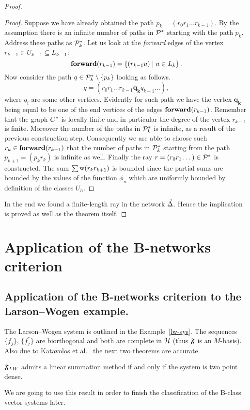 \documentclass[12pt]{amsart}
\begin{document}
\begin{proof}
\begin{proof}
        Suppose we have already obtained the path $p_k= (r_0 r_1\dots r_{k-1})$.
        By the assumption there is an infinite number of paths in $\cal{P}^*$ starting with the path $p_k$.
        Address these paths as $\cal{P}^*_k$.
        Let us look at the \emph{forward} edges of the vertex $r_{k-1} \in U_{k-1} \subseteq L_{k-1}$:
        \[
          \efor(r_{k-1})=\left\{(r_{k-1} u) \mid u \in L_k\right\}.
        \]
        Now consider the path $q \in \cal{P}^*_k \setminus \left\{p_k\right\}$ looking as follows.
        \[
          q=(r_0 r_1 \dots r_{k-1} \mathbf{q_k} q_{k+1} \dots),
        \]
          where $q_i$ are some other vertices.
        Evidently for such path we have the vertex $\mathbf{q_k}$ being equal to be one of the end vertices of the edges $\efor(r_{k-1})$.
        Remember that the graph $\gstar$ is locally finite and in particular the degree of the vertex $r_{k-1}$ is finite.
        Moreover the number of the paths in $\cal{P}^*_k$ is infinite, as a result of the previous construction step.
        Consequently we are able to choose such $r_k \in \efor(r_{k-1})$ that the number of paths in $\cal{P}^*_k$ starting from
          the path $p_{k+1}= (p_k r_k)$ is infinite as well.
        Finally the ray $r = (r_0 r_1 \dots) \in \cal{P}^*$ is constructed.
        The sum $\sum \wtp(r_k r_{k+1})$ is bounded since the partial sums are bounded by the values of the function $\phi_n$
         which are uniformly bounded by definition of the classes $U_n$.
      \end{proof}
      In the end we found a finite-length ray in the network $\onet$.
      Hence the implication is proved as well as the theorem itself.
    \end{proof}

  \section{Application of the B-networks criterion}
    \subsection{Application of the B-networks criterion to the Larson--Wogen example.}
      The Larson--Wogen system is outlined in the Example~\ref{lw-sys}.
      The sequences $\{f_j\}$, $\{f^*_j\}$ are biorthogonal and both are complete in $\cal{H}$ (thus $\fsys$ is an $M$-basis).
      Also due to Katavolos et al.~\cite{katavolos} the next two theorems are accurate.
      \begin{theorem}
        \label{thm-katavolos-1}
          $\fsys_{LW}$ admits a linear summation method if and only if the system is two point dense.
      \end{theorem}
      \begin{note}
        We are going to use this result in order to finish the classification of the B-class vector systems later.
      \end{note}
\end{document}
